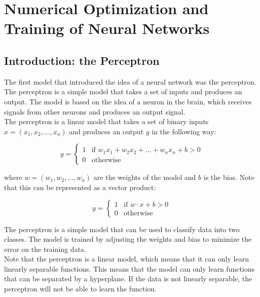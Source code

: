 \chapter{Numerical Optimization and Training of Neural Networks}

\section{Introduction: the Perceptron}

The first model that introduced the idea of a neural network was the perceptron. 
The perceptron is a simple model that takes a set of inputs and produces an output. 
The model is based on the idea of a neuron in the brain, which receives signals from 
other neurons and produces an output signal.\\

The perceptron is a linear model that takes a set of binary inputs 
$x = (x_1, x_2, \ldots, x_n)$ and produces an output $y$ in the following way:

\begin{equation}
    y = \begin{cases}
        1 & \text{if } w_1 x_1 + w_2 x_2 + \ldots + w_n x_n + b > 0\\
        0 & \text{otherwise}
    \end{cases}
\end{equation}

where $w = (w_1, w_2, \ldots, w_n)$ are the weights of the model and $b$ is the bias.
Note that this can be represented as a vector product:

\begin{equation}
    y = \begin{cases}
        1 & \text{if } w \cdot x + b > 0\\
        0 & \text{otherwise}
    \end{cases}
\end{equation}

The perceptron is a simple model that can be used to classify data into two classes.
The model is trained by adjusting the weights and bias to minimize the error on the 
training data.\\

Note that the perceptron is a linear model, which means that it can only learn linearly
separable functions. This means that the model can only learn functions that can be
separated by a hyperplane. If the data is not linearly separable, the perceptron will 
not be able to learn the function.\\

